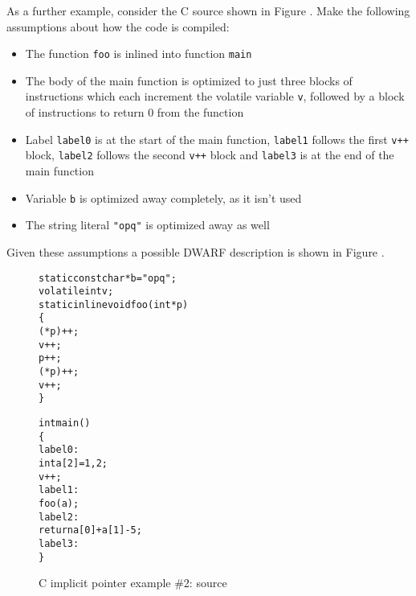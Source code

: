 As a further example, consider the C source 
shown in Figure . Make
the following assumptions about how the code is compiled:
\begin{itemize}
\item The function \texttt{foo} is inlined
into function \texttt{main}
\item The body of the main function is optimized to just
three blocks of instructions which each increment the volatile
variable \texttt{v}, followed by a block of instructions to return 0 from
the function
\item Label \texttt{label0} is at the start of the main
function, \texttt{label1} follows the first \texttt{v++} block, 
\texttt{label2} follows the second \texttt{v++} block and 
\texttt{label3} is at the end of the main function
\item Variable \texttt{b} is optimized away completely, as it isn't used
\item The string literal \texttt{"opq"} is optimized away as well
\end{itemize}
Given these assumptions a possible DWARF description is shown in
Figure .

\begin{figure}[ht]
\begin{dwflisting}
\begin{alltt}

static const char *b = "opq";
volatile int v;
static inline void foo (int *p)
\{
    (*p)++;
    v++;
    p++;
    (*p)++;
    v++;
\}

int main ()
\{
label0:
    int a[2] = { 1, 2 };
    v++;
label1:
    foo (a);
label2:
    return a[0] + a[1] - 5;
label3:
\}

\end{alltt}
\end{dwflisting}
\caption{C implicit pointer example \#2: source}
\label{fig:cimplicitpointerexample2source}
\end{figure}

